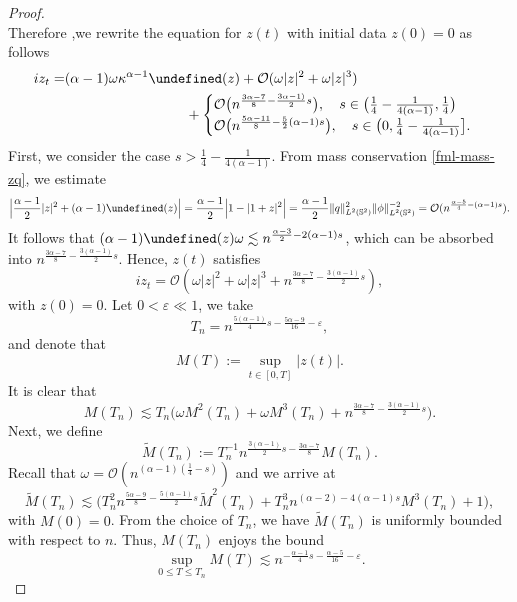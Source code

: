 \documentclass[11pt, reqno]{amsart}
\numberwithin{equation}{section}
\let\Re=\undefined\DeclareMathOperator*{\Re}{Re}
\theoremstyle{definition}
\theoremstyle{remark}
\begin{document}
{\begin{proof}
\begin{equation*}
\end{equation*}
Therefore ,we rewrite the equation for $z(t)$ with initial data $z(0)=0$ as follows
\begin{align*}
iz_t=&(\alpha-1)\omega \kappa^{\alpha-1} \Re(z) +\mathcal{O}(\omega|z|^2+\omega|z|^3) \\
&\hspace{20ex}+ 
\begin{cases}
\mathcal{O}\big(n^{\frac{3\alpha-7}{8}-\frac{3\alpha-1)}{2}s}\big),\quad s\in\big(\frac{1}{4}-\frac{1}{4(\alpha-1)},\frac{1}{4}\big)\\
\mathcal{O}\big( n^{\frac{5\alpha-11}{8}-\frac{5}{2}(\alpha-1)s} \big),\quad s\in\big(0,\frac{1}{4}-\frac{1}{4(\alpha-1)}\big] .
\end{cases}
\end{align*} 
First, we  consider the case  $s>\frac{1}{4}-\frac{1}{4(\alpha-1)}$. From mass conservation \eqref{fml-mass-zq}, we estimate
\begin{equation*}
\Big| \frac{\alpha-1}{2}|z|^2+(\alpha-1)\Re(z)\Big|=\frac{\alpha-1}{2}\Big| 1-|1+z|^2 \Big|=\frac{\alpha-1}{2}\|q\|^2_{L^2(\Bbb S^2)}\|\phi\|^{-2}_{L^2(\Bbb S^2)} = \mathcal{O}(n^{\frac{\alpha-5}{4}-(\alpha-1)s}).
\end{equation*}
It follows that $(\alpha-1)\Re(z)\omega \lesssim n^{\frac{\alpha-3}{2}-2(\alpha-1)s}$, which can be absorbed into $n^{\frac{3\alpha-7}{8}-\frac{3(\alpha-1)}{2}s}$. Hence,  $z(t)$ satisfies 
\begin{equation}\label{fml-z-eq-refined}
iz_t=\mathcal{O}(\omega|z|^2+\omega|z|^3+n^{\frac{3\alpha-7}{8}-\frac{3(\alpha-1)}{2}s}),
\end{equation}
with $z(0)=0$. Let $0<\varepsilon\ll1$, we take
\begin{equation*}
T_n = n^{\frac{5(\alpha-1)}{4}s-\frac{5\alpha-9}{16}-\varepsilon},
\end{equation*}
and denote that
\begin{equation*}
M(T) := \sup_{t\in[0,T]}|z(t)|.
\end{equation*}
It is clear that
\begin{equation*}
M(T_n) \lesssim T_n\big(\omega M^2(T_n)+\omega M^3(T_n) + n^{\frac{3\alpha-7}{8}-\frac{3(\alpha-1)}{2}s}\big).
\end{equation*}
Next, we define 
\begin{equation*}
\widetilde{M}(T_n) := T_n^{-1}n^{\frac{3(\alpha-1)}{2}s-\frac{3\alpha-7}{8}} M(T_n).
\end{equation*}
Recall that $\omega=\mathcal{O}(n^{(\alpha-1)(\frac{1}{4}-s)})$ and we arrive at
\begin{equation*}
\widetilde{M}(T_n) \lesssim \big(T_n^2n^{\frac{5\alpha-9}{8}-\frac{5(\alpha-1)}{2}s}\widetilde{M}^2(T_n)+T_n^3n^{(\alpha-2)-4(\alpha-1)s}M^3(T_n) + 1\big), 
\end{equation*}
with $M(0)=0$. From the choice of $T_n$, we have $\widetilde{M}(T_n)$ is uniformly bounded with respect to $n$. Thus, $M(T_n)$ enjoys the bound
\begin{equation*}
\sup_{0\le T\le T_n}M(T) \lesssim n^{-\frac{\alpha-1}{4}s-\frac{\alpha-5}{16}-\varepsilon}.
\end{equation*}
		

\end{proof}}
\end{document}
